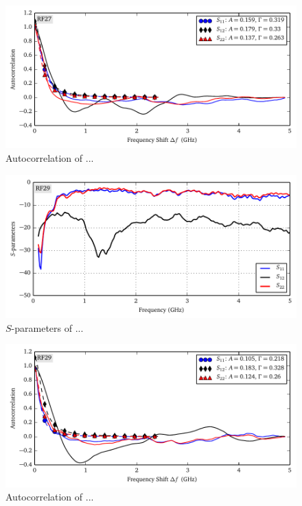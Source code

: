 \begin{figure}
 \centering
 \includegraphics{figs/active/RF27-autoCorrelation.pdf}
 \caption{Autocorrelation of ...}
\end{figure}

\begin{figure}
 \centering
 \includegraphics{figs/active/RF29-sParameters.pdf}
 \caption{$S$-parameters of ...}
\end{figure}

\begin{figure}
 \centering
 \includegraphics{figs/active/RF29-autoCorrelation.pdf}
 \caption{Autocorrelation of ...}
\end{figure}


